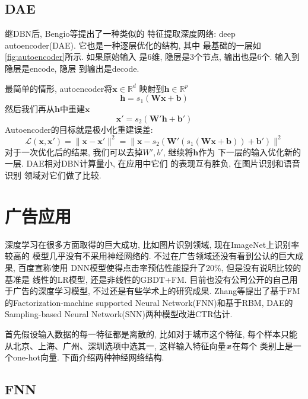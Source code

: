 \documentclass{ctexart}
\begin{document}
\subsection{DAE}
继DBN后, Bengio等\cite{bengio2007greedy}提出了一种类似的
特征提取深度网络: deep autoencoder(DAE). 它也是一种逐层优化的结构, 其中
最基础的一层如\autoref{fig:autoencoder}所示. 如果原始输入
是6维, 隐层是3个节点, 输出也是6个. 输入到隐层是encode, 隐层
到输出是decode.

最简单的情形, autoencoder将\( \mathbf{x} \in \mathbb{R}^d\)
映射到\(\mathbf{h} \in \mathbb{R}^p\)
\[
  \mathbf{h} = s_1(\mathbf{Wx}+\mathbf{b})
\]
然后我们再从\(\mathbf{h}\)中重建\(\mathbf{x}\)
\[
  \mathbf{x'} = s_2(\mathbf{W'h}+\mathbf{b'})
\]
Autoencoder的目标就是极小化重建误差:
\[
  \mathcal{L}(\mathbf{x},\mathbf{x'})=
  \|\mathbf{x}-\mathbf{x'}\|^2=
  \|\mathbf{x}-s_2(\mathbf{W'}(s_1(\mathbf{Wx}+\mathbf{b}))+\mathbf{b'})\|^2
\]
对于一次优化后的结果, 我们可以去掉\(W', b'\), 继续将\(\mathbf{h}\)作为
下一层的输入优化新的一层. DAE相对DBN计算量小, 在应用中它们
的表现互有胜负, \cite{cho2013boltzmann,deng2010binary}在图片识别和语音识别
领域对它们做了比较.


\section{广告应用}
深度学习在很多方面取得的巨大成功, 比如图片识别领域, 现在ImageNet上识别率较高的
模型几乎没有不采用神经网络的. 不过在广告领域还没有看到公认的巨大成果, 百度宣称使用
DNN模型使得点击率预估性能提升了20\%, 但是没有说明比较的基准是
线性的LR模型, 还是非线性的GBDT+FM.
目前也没有公司公开的自己用于广告的深度学习模型, 不过还是有些学术上的研究成果.
Zhang等\cite{zhang2016deep}提出了基于FM的Factorization-machine supported Neural
Network(FNN)和基于RBM, DAE的Sampling-based Neural Network(SNN)两种模型改进CTR估计.

首先假设输入数据的每一特征都是离散的, 比如对于城市这个特征,
每个样本只能从北京、上海、广州、深圳选项中选其一, 这样输入特征向量\(\boldsymbol{x}\)在每个
类别上是一个one-hot向量. 下面介绍两种神经网络结构.

\subsection{FNN}
\end{document}
